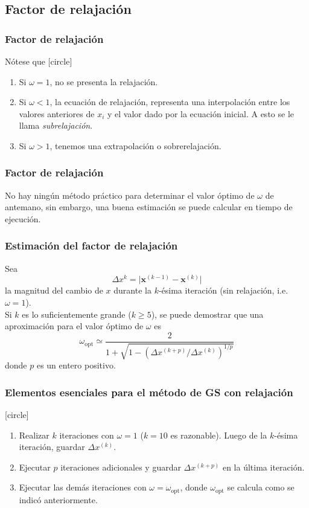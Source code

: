 \subsection{Factor de relajación}
\begin{frame}
\frametitle{Factor de relajación}
Nótese que
[circle]
\begin{enumerate}[<+->]
\item  Si $\omega=1$, no se presenta la relajación.
\item Si $\omega<1$, la ecuación de relajación, representa una interpolación entre los valores anteriores de $x_{i}$ y el valor dado por la ecuación inicial. A esto se le llama \emph{subrelajación}.
\item Si $\omega>1$, tenemos una extrapolación o sobrerelajación.
\end{enumerate}
\end{frame}
\begin{frame}
\frametitle{Factor de relajación}
No hay ningún método práctico para determinar el valor óptimo de $\omega$ de antemano, sin embargo, una buena estimación se puede calcular en tiempo de ejecución.
\end{frame}
\begin{frame}
\frametitle{Estimación del factor de relajación}
Sea
\[ \Delta x^{k} = \vert \mathbf{x}^{(k-1)} - \mathbf{x}^{(k)} \vert \]
la magnitud del cambio de $x$ durante la $k$-ésima iteración (sin relajación, i.e. $\omega=1$).
\\
\medskip
\pause
Si $k$ es lo suficientemente grande ($k\geqslant5$), se puede demostrar que una aproximación para el valor óptimo de $\omega$ es
\[ \omega_{\mbox{opt}} \simeq \dfrac{2}{1 + \sqrt{1- (\Delta x^{(k+p)} / \Delta x^{(k)})^{1/p}}} \]
donde $p$ es un entero positivo.
\end{frame}
\begin{frame}
\frametitle{Elementos esenciales para el método de GS con relajación}
[circle]
\begin{enumerate}[<+->]
\item Realizar $k$ iteraciones con $\omega=1$ ($k=10$ es razonable). Luego de la $k$-ésima iteración, guardar $\Delta x^{(k)}$.
\item Ejecutar $p$ iteraciones adicionales y guardar $\Delta x^{(k+p)}$ en la última iteración.
\item Ejecutar las demás iteraciones con $\omega = \omega_{\mbox{opt}}$, donde $\omega_{\mbox{opt}}$ se calcula como se indicó anteriormente.
\end{enumerate}
\end{frame}
